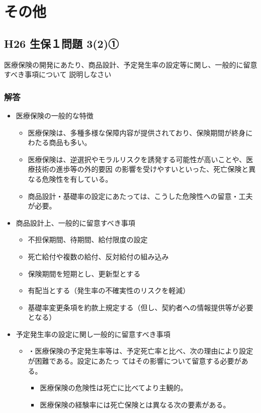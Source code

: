 \documentclass[report,gutter=10mm,fore-edge=10mm,uplatex,dvipdfmx]{jlreq}
\begin{document}
\section{その他}
\subsection{H26 生保１問題 3(2)①}
医療保険の開発にあたり、商品設計、予定発生率の設定等に関し、一般的に留意すべき事項について
説明しなさい
\subsubsection{解答}
\begin{itemize}
 \item 医療保険の一般的な特徴
\begin{itemize}
 \item 医療保険は、多種多様な保障内容が提供されており、保険期間が終身にわたる商品も多い。
 \item 医療保険は、逆選択やモラルリスクを誘発する可能性が高いことや、医療技術の進歩等の外的要因
の影響を受けやすいといった、死亡保険と異なる危険性を有している。
 \item 商品設計・基礎率の設定にあたっては、こうした危険性への留意・工夫が必要。
\end{itemize}
 \item 商品設計上、一般的に留意すべき事項
\begin{itemize}
 \item 不担保期間、待期間、給付限度の設定
 \item 死亡給付や複数の給付、反対給付の組み込み
 \item 保険期間を短期とし、更新型とする
 \item 有配当とする（発生率の不確実性のリスクを軽減）
 \item 基礎率変更条項を約款上規定する（但し、契約者への情報提供等が必要となる）
\end{itemize}
 \item 予定発生率の設定に関し一般的に留意すべき事項
\begin{itemize}
 \item 
・医療保険の予定発生率等は、予定死亡率と比べ、次の理由により設定が困難である。設定にあたっ
てはその影響について留意する必要がある。
\begin{itemize}
 \item 医療保険の危険性は死亡に比べてより主観的。
 \item  医療保険の経験率には死亡保険とは異なる次の要素がある。
\begin{itemize}

\end{itemize}
\end{itemize}
\end{itemize}
\end{itemize}
\end{document}
